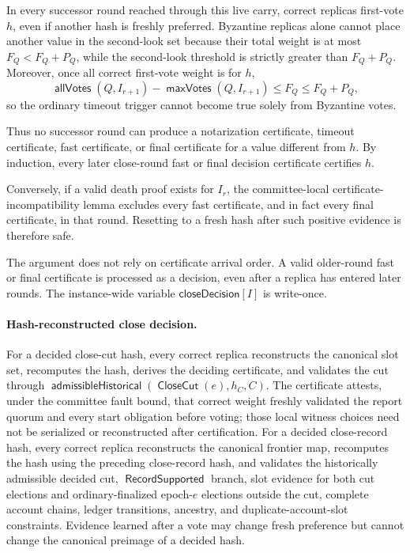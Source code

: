 \documentclass[sigplan,twocolumn,review,anonymous]{acmart}
\newcommand{\func}[1]{\operatorname{\mathsf{#1}}}
\newcommand{\allVotes}{\func{allVotes}}
\newcommand{\maxVotes}{\func{maxVotes}}
\newcommand{\CloseCut}{\func{CloseCut}}
\newcommand{\closeDecision}{\mathsf{closeDecision}}
\newcommand{\admissibleHistorical}{\func{admissibleHistorical}}
\newcommand{\RecordSupported}{\func{RecordSupported}}
\begin{document}
In every successor round reached through this live carry, correct replicas first-vote \(h\), even if
another hash is freshly preferred.  Byzantine replicas alone cannot place another value in the
second-look set because their total weight is at most \(F_Q<F_Q+P_Q\), while the second-look threshold
is strictly greater than \(F_Q+P_Q\).  Moreover, once all correct first-vote weight is for \(h\),
\[
\allVotes(Q,I_{r+1})-\maxVotes(Q,I_{r+1})
\le F_Q
\le F_Q+P_Q,
\]
so the ordinary timeout trigger cannot become true solely from Byzantine votes.

Thus no successor round can produce a notarization certificate, timeout certificate, fast certificate,
or final certificate for a value different from \(h\).  By induction, every later close-round fast or
final decision certificate certifies \(h\).

Conversely, if a valid death proof exists for \(I_r\), the committee-local certificate-incompatibility lemma excludes every
fast certificate, and in fact every final certificate, in that round.  Resetting to a fresh hash after
such positive evidence is therefore safe.

The argument does not rely on certificate arrival order.  A valid older-round fast or final certificate
is processed as a decision, even after a replica has entered later rounds.  The instance-wide variable \(\closeDecision[I]\) is
write-once.

\paragraph{Hash-reconstructed close decision.}
For a decided close-cut hash, every correct replica reconstructs the canonical slot set, recomputes the
hash, derives the deciding certificate, and validates the cut through
\(\admissibleHistorical(\CloseCut(e),h_C,C)\).  The certificate attests, under the committee fault
bound, that correct weight freshly validated the report quorum and every start obligation before voting;
those local witness choices need not be serialized or reconstructed after certification.  For a decided
close-record hash, every correct replica reconstructs the canonical frontier map, recomputes the hash
using the preceding close-record hash, and validates the historically admissible decided cut,
\(\RecordSupported\) branch, slot evidence for both cut elections and ordinary-finalized epoch-\(e\)
elections outside the cut, complete account chains, ledger transitions, ancestry, and
duplicate-account-slot constraints.  Evidence learned after a vote may change fresh preference but
cannot change the canonical preimage of a decided hash.
\end{document}
